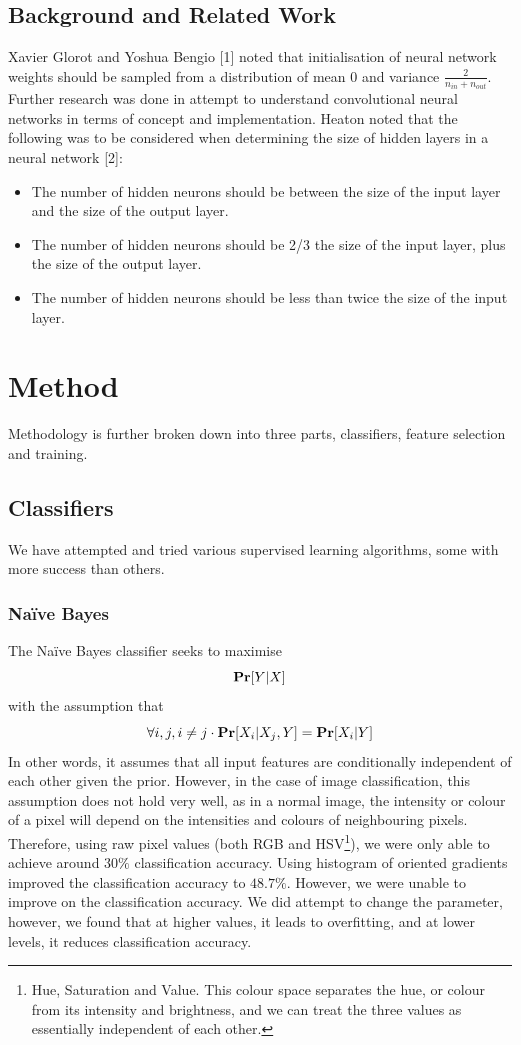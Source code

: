 \documentclass{article} %
\begin{document}
\subsection{Background and Related Work}

Xavier Glorot and Yoshua Bengio [1] noted that initialisation of neural network weights should be sampled from a distribution of mean 0 and variance $\frac{2}{n_{in}+n_{out}}$.
Further research was done in attempt to understand convolutional neural networks in terms of concept and implementation. Heaton noted that the following was to be considered when determining the size of hidden layers in a neural network [2]:
\begin{itemize}
  \item The number of hidden neurons should be between the size of the input layer and the size of the output layer.
  \item The number of hidden neurons should be 2/3 the size of the input layer, plus the size of the output layer.
  \item The number of hidden neurons should be less than twice the size of the input layer.
\end{itemize}



\section{Method}
Methodology is further broken down into three parts, classifiers, feature selection and training.

\subsection{Classifiers}
We have attempted and tried various supervised learning algorithms, some with more success than others.

\subsubsection{Na\"ive Bayes}
The Na\"ive Bayes classifier seeks to maximise
$$\mathbf{Pr}[{Y|X}]$$
with the assumption that
$$\forall i,j,  i\neq j \cdot \mathbf{Pr}[{X_i|X_j, Y}]=\mathbf{Pr}[{X_i|Y}]$$
In other words, it assumes that all input features are conditionally independent of each other given the prior. However, in the case of image classification, this assumption does
not hold very well, as in a normal image, the intensity or colour of a pixel will depend on the intensities and colours of neighbouring pixels. Therefore, using raw pixel values (both 
RGB and HSV\footnote{Hue, Saturation and Value. This colour space separates the hue, or colour from its intensity and brightness, and we can treat the three values as essentially independent of each other.}), we were only able to achieve around $30\%$ classification accuracy. Using histogram of oriented gradients improved the classification accuracy to $48.7\%$. However, we
were unable to improve on the classification accuracy. We did attempt to change the  parameter, however, we found that at higher values, it leads to overfitting, and
at lower levels, it reduces classification accuracy.
\end{document}
